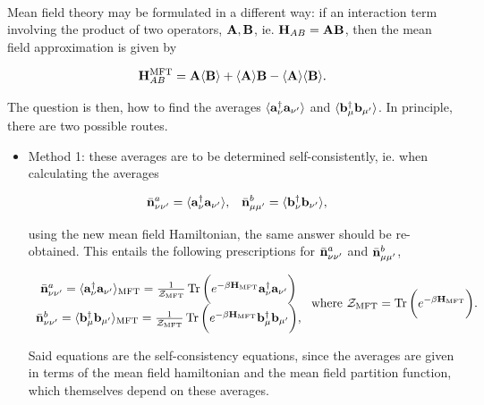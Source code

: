 \blanky \\

Mean field theory may be formulated in a different way: if an interaction term involving the product of two operators, ${\bf A}, {\bf B}$, ie. ${\bf H}_{AB} = {\bf A} {\bf B}$, then the mean field approximation is given by 

$$
    {\bf H}_{AB}^{\textnormal{MFT}} = {\bf A} \langle{\bf B}\rangle + \langle{\bf A} \rangle{{\bf B}} - \langle{\bf A} \rangle\langle{\bf B} \rangle.
$$

The question is then, how to find the averages $\langle {\bf a}_{\nu}^\dagger {\bf a}_{\nu'} \rangle$ and $\langle {\bf b}_{\mu}^\dagger {\bf b}_{\mu'} \rangle$. In principle, there are two possible routes. 

\begin{itemize}
    \item Method 1: these averages are to be determined self-consistently, ie. when calculating the averages 
    
    \begin{align}
        \bar{{\bf n}}_{\nu \nu'}^{a} &= \langle {\bf a}_{\nu}^\dagger {\bf a}_{\nu'} \rangle, & \bar{{\bf n}}_{\mu \mu'}^{b} &= \langle {\bf b}_{\nu}^\dagger {\bf b}_{\nu'} \rangle,
    \end{align}
    
    using the new mean field Hamiltonian, the same answer should be re-obtained. This entails the following prescriptions for $\bar{{\bf n}}_{\nu \nu'}^{a}$ and $\bar{{\bf n}}_{\mu \mu'}^{b}$,
    
     \begin{align} 
     \begin{array}{c}
        \bar{{\bf n}}_{\nu \nu'}^{a} = \langle {\bf a}_{\nu}^\dagger {\bf a}_{\nu'} \rangle_{\textnormal{MFT}} = \frac{1}{\mathcal{Z}_{\textnormal{MFT}}} \Tr \bigg(e^{-\beta {\bf H}_{\textnormal{MFT}}} {\bf a}_{\nu}^\dagger {\bf a}_{\nu'}\bigg) \\ \bar{{\bf n}}_{\nu \nu'}^{b} = \langle {\bf b}_{\mu}^\dagger {\bf b}_{\mu'} \rangle_{\textnormal{MFT}} = \frac{1}{\mathcal{Z}_{\textnormal{MFT}}} \Tr \bigg(e^{-\beta {\bf H}_{\textnormal{MFT}}} {\bf b}_{\mu}^\dagger {\bf b}_{\mu'}\bigg),
     \end{array} \textnormal{ where } \mathcal{Z}_{\textnormal{MFT}} = \Tr \bigg(e^{-\beta {\bf H}_{\textnormal{MFT}}}\bigg).
    \end{align}
    
    Said equations are the self-consistency equations, since the averages are given in terms of the mean field hamiltonian and the mean field partition function, which themselves depend on these averages. \\
    

\end{itemize}
